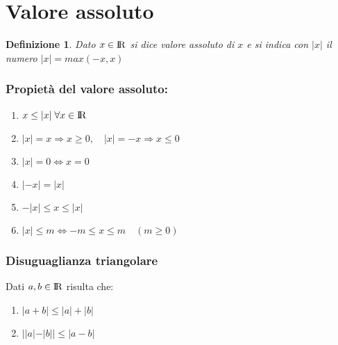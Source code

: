 \documentclass[12pt, a4paper]{article}
\theoremstyle{break}
\newtheorem{definition}{Definizione}[subsection]
\newcommand\R{{\rm I\!R}}
\begin{document}
    \section{Valore assoluto}
    \begin{definition}
        Dato $x\in\R$ si dice valore assoluto di $x$ e si indica con $|x|$ il numero $|x| = max(-x,x)$
    \end{definition}
    \subsubsection{Propietà del valore assoluto:}
    \begin{enumerate}
        \item $x\leq |x|\;\forall x\in\R$
        \item $|x| = x \Rightarrow x\geq0,\quad |x| = -x \Rightarrow x\leq0$
        \item $|x| = 0 \Leftrightarrow x = 0$
        \item $|-x| = |x|$
        \item $-|x|\leq x\leq |x|$
        \item $|x|\leq m \Leftrightarrow -m\leq x\leq m\quad (m\geq0)$
    \end{enumerate}
    \begin{figure}[!htb]
        \centering
    \end{figure}
    \subsubsection{Disuguaglianza triangolare}
    Dati $a,b\in\R$ risulta che:
    \begin{enumerate}
        \item $|a+b|\leq|a|+|b|$
        \item $||a|-|b||\leq|a-b|$
    \end{enumerate}
    \newpage
\end{document}
